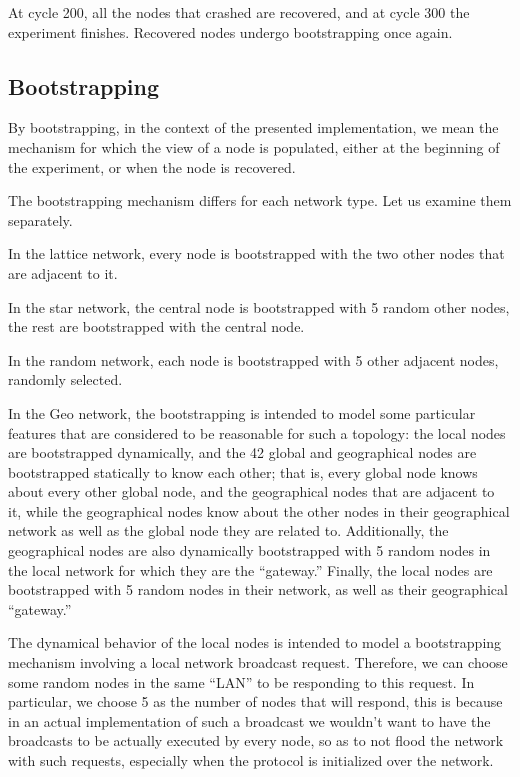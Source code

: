 \documentclass[a4paper]{ifacconf}
\begin{document}
At cycle 200, all the nodes that crashed are recovered, and at cycle 300 the experiment finishes.
Recovered nodes undergo bootstrapping once again.

\subsection{Bootstrapping}

By bootstrapping, in the context of the presented implementation, we mean the mechanism for which the view of a node is populated, either at the beginning of the experiment, or when the node is recovered.

The bootstrapping mechanism differs for each network type.
Let us examine them separately.

In the lattice network, every node is bootstrapped with the two other nodes that are adjacent to it.

In the star network, the central node is bootstrapped with 5 random other nodes, the rest are bootstrapped with the central node.

In the random network, each node is bootstrapped with 5 other adjacent nodes, randomly selected.

In the Geo network, the bootstrapping is intended to model some particular features that are considered to be reasonable for such a topology: the local nodes are bootstrapped dynamically, and the 42 global and geographical nodes are bootstrapped statically to know each other; that is, every global node knows about every other global node, and the geographical nodes that are adjacent to it, while the geographical nodes know about the other nodes in their geographical network as well as the global node they are related to.
Additionally, the geographical nodes are also dynamically bootstrapped with 5 random nodes in the local network for which they are the ``gateway.''
Finally, the local nodes are bootstrapped with 5 random nodes in their network, as well as their geographical ``gateway.''

The dynamical behavior of the local nodes is intended to model a bootstrapping mechanism involving a local network broadcast request.
Therefore, we can choose some random nodes in the same ``LAN'' to be responding to this request.
In particular, we choose 5 as the number of nodes that will respond, this is because in an actual implementation of such a broadcast we wouldn't want to have the broadcasts to be actually executed by every node, so as to not flood the network with such requests, especially when the protocol is initialized over the network.
\end{document}

